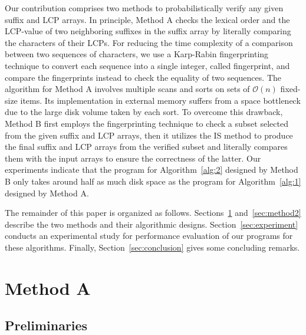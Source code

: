 \documentclass[10pt,journal,compsoc]{IEEEtran}
\begin{document}
Our contribution comprises two methods to probabilistically verify any given suffix and LCP arrays. In principle, Method A checks the lexical order and the LCP-value of two neighboring suffixes in the suffix array by literally comparing the characters of their LCPs. For reducing the time complexity of a comparison between two sequences of characters, we use a Karp-Rabin fingerprinting technique to convert each sequence into a single integer, called fingerprint, and compare the fingerprints instead to check the equality of two sequences. The algorithm for Method A involves multiple scans and sorts on sets of $\mathcal{O}(n)$ fixed-size items. Its implementation in external memory suffers from a space bottleneck due to the large disk volume taken by each sort. 
To overcome this drawback, Method B first employs the fingerprinting technique to check a subset selected from the given suffix and LCP arrays, 
then it utilizes the IS method to produce the final suffix and LCP arrays from the verified subset and literally compares them with the input arrays to ensure the correctness of the latter. Our experiments indicate that the program for Algorithm~\ref{alg:2} designed by Method B only takes around half as much disk space as the program for Algorithm~\ref{alg:1} designed by Method A.

The remainder of this paper is organized as follows. Sections~\ref{sec:method1} and~\ref{sec:method2} describe the two methods and their algorithmic designs. Section~\ref{sec:experiment} conducts an experimental study for performance evaluation of our programs for these algorithms. Finally, Section~\ref{sec:conclusion} gives some concluding remarks.

\section{Method A} \label{sec:method1}


\subsection{Preliminaries} \label{sec:method1:notations}
\end{document}
